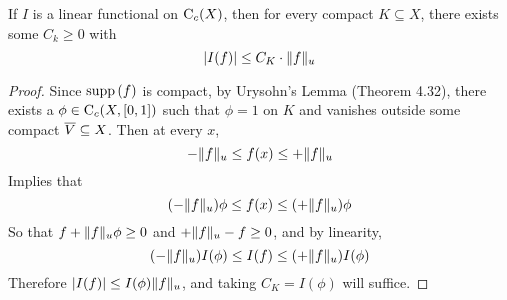 \documentclass[../../main.tex]{subfiles}
\begin{document}
\begin{wts}
    If $I$ is a linear functional on $\operatorname{C}_c({X})$, then for every compact $K\subseteq X$, there exists some $C_k\geq 0$ with
    \[
    |I(f)|\leq C_K\cdot \lVert {f} \rVert_u
    \]
\end{wts}
\begin{proof}
    Since $\operatorname{supp}{(f)}$ is compact, by Urysohn's Lemma (Theorem 4.32), there exists a $\phi\in\operatorname{C}_c({X,[0,1]})$ such that $\phi=1$ on $K$ and vanishes outside some compact $\overline{V}\subseteq X$. Then at every $x$,
    \[
    -\lVert {f} \rVert_u\leq f(x)\leq +\lVert {f} \rVert_u
    \]
    Implies that
    \[
    (-\lVert {f} \rVert_u)\phi \leq f(x)\leq (+\lVert {f} \rVert_u)\phi
    \]
    So that $f+\lVert {f} \rVert_u\phi\geq 0$ and $+\lVert {f} \rVert_u-f\geq 0$, and by linearity,
    \[
    (-\lVert {f} \rVert_u)I(\phi)\leq I(f)\leq (+\lVert {f} \rVert_u)I(\phi)
    \]
    Therefore $|I(f)|\leq I(\phi)\lVert {f} \rVert_u$, and taking $C_K = I(\phi)$ will suffice.
\end{proof}
\end{document}
